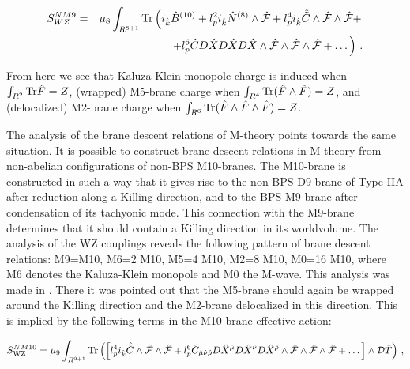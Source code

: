 \documentclass[12pt,a4paper]{article}
\begin{document}
\begin{eqnarray}
\label{NM9}
S^{N M9}_{WZ}&=&\mu_8\int_{R^{8+1}}{\rm Tr}\left(i_{\hat k}{\hat B}^{(10)}
+l_p^2 i_{\hat k}{\hat N}^{(8)}\wedge {\hat {\cal F}}
+l_p^4 i_{\hat k}{\hat {\tilde C}}
\wedge {\hat {\cal F}}\wedge {\hat {\cal F}}+\right. \nonumber\\
&&\left. +l_p^6 {\hat C}D{\hat X}D{\hat X}D{\hat X}\wedge 
{\hat {\cal F}}
\wedge {\hat {\cal F}}\wedge {\hat {\cal F}}+\dots\right)\, .
\end{eqnarray}

\noindent {}From here we see that
Kaluza-Klein monopole charge is induced when 
$\int_{R^2}{\rm Tr}{\hat F}=Z$, (wrapped) M5-brane charge when
$\int_{R^4}{\rm Tr}({\hat F}\wedge {\hat F})=Z$, and (delocalized)
M2-brane charge when $\int_{R^6}{\rm Tr}({\hat F}\wedge{\hat F}
\wedge {\hat F})=Z$.


The analysis of the brane descent relations of M-theory points
towards the same situation. It is possible to construct
brane descent relations in M-theory from non-abelian
configurations of non-BPS M10-branes. The M10-brane is constructed in
such a way that it gives rise to the non-BPS
D9-brane of Type IIA \cite{Horava} after 
reduction along a Killing direction, and to the BPS M9-brane after
condensation of its tachyonic mode. This connection with the M9-brane
determines that it should contain a Killing direction in its 
worldvolume. The analysis of the WZ couplings reveals the
following pattern of brane descent relations: M9=M10, M6=2 M10, 
M5=4 M10, M2=8 M10, M0=16 M10, where M6 denotes the Kaluza-Klein
monopole and M0 the M-wave. This analysis was made in \cite{HL3}.
There it was pointed out that the M5-brane should again be wrapped
around the Killing direction and the M2-brane delocalized in this
direction. This is implied by the following terms
in the M10-brane effective action:

\begin{equation}
\label{M10}
S^{N M10}_{{\rm WZ}}=\mu_9\int_{R^{9+1}}{\rm Tr}\left(\left[l_p^4
i_{\hat k}
{\hat {\tilde C}}
\wedge {\hat {\cal F}}\wedge {\hat {\cal F}}+
l_p^6{\hat C}_{{\hat \mu}
{\hat \nu}{\hat \rho}}D{\hat X}^{\hat \mu}
D{\hat X}^{\hat \nu}D{\hat X}^{\hat \rho}\wedge 
{\hat {\cal F}}
\wedge {\hat {\cal F}}\wedge {\hat {\cal F}}
+\dots\right]\wedge {\cal D}{\hat T}\right)\, ,
\end{equation}
\end{document}
